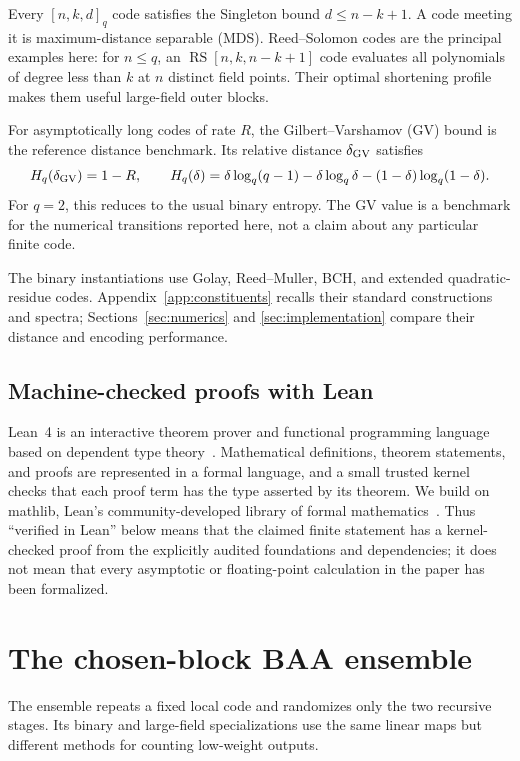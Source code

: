 \documentclass[runningheads,envcountsame,envcountsect]{llncs}
\begin{document}
Every $[n,k,d]_q$ code satisfies the Singleton bound $d\le n-k+1$.  A code
meeting it is maximum-distance separable (MDS).  Reed--Solomon codes are
the principal examples here: for $n\le q$, an
$\operatorname{RS}[n,k,n-k+1]$ code evaluates all polynomials of degree less
than $k$ at $n$ distinct field points.  Their optimal shortening profile makes
them useful large-field outer blocks.

For asymptotically long codes of rate $R$, the Gilbert--Varshamov (GV) bound is
the reference distance benchmark.  Its relative distance $\delta_{\rm GV}$
satisfies
\[
    H_q(\delta_{\rm GV})=1-R,
    \qquad
    H_q(\delta)
      =\delta\log_q(q-1)-\delta\log_q\delta
       -(1-\delta)\log_q(1-\delta).
\]
For $q=2$, this reduces to the usual binary entropy.  The GV value is a
benchmark for the numerical transitions reported here, not a claim about any
particular finite code.

The binary instantiations use Golay, Reed--Muller, BCH, and extended
quadratic-residue codes.  Appendix~\ref{app:constituents} recalls their
standard constructions and spectra; Sections~\ref{sec:numerics} and
\ref{sec:implementation} compare their distance and encoding performance.

\subsection{Machine-checked proofs with Lean}
\label{sec:lean-prelim}

Lean~4 is an interactive theorem prover and functional programming language
based on dependent type theory~\cite{demoura21lean4}.  Mathematical definitions,
theorem statements, and proofs are represented in a formal language, and a small
trusted kernel checks that each proof term has the type asserted by its theorem.
We build on mathlib, Lean's community-developed library of formal
mathematics~\cite{mathlib2020}.  Thus ``verified in Lean'' below means that the
claimed finite statement has a kernel-checked proof from the explicitly audited
foundations and dependencies; it does not mean that every asymptotic or
floating-point calculation in the paper has been formalized.

\section{The chosen-block BAA ensemble}
\label{sec:construction}

The ensemble repeats a fixed local code and randomizes only the two recursive
stages.  Its binary and large-field specializations use the same linear maps but
different methods for counting low-weight outputs.
\end{document}
